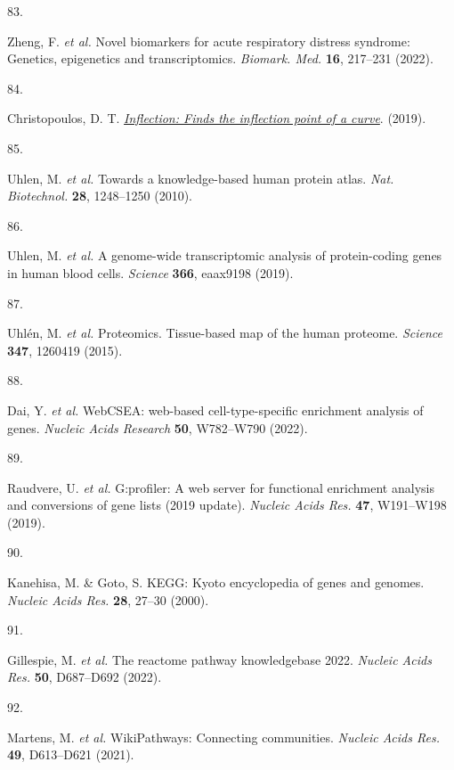 \documentclass[
  11,
  a4paper,
]{article}
\newlength{\cslhangindent}
\newlength{\csllabelwidth}
\newlength{\cslentryspacingunit} %
\newenvironment{CSLReferences}[2] %
 {%
  \setlength{\parindent}{0pt}
  \ifodd #1
  \let\oldpar\par
  \def\par{\hangindent=\cslhangindent\oldpar}
  \fi
  \setlength{\parskip}{#2\cslentryspacingunit}
 }%
 {}
\newcommand{\CSLLeftMargin}[1]{\parbox[t]{\csllabelwidth}{#1}}
\newcommand{\CSLRightInline}[1]{\parbox[t]{\linewidth - \csllabelwidth}{#1}\break}
\begin{document}
\begin{CSLReferences}{0}{0}
\leavevmode{}%
\CSLLeftMargin{83. }%
\CSLRightInline{Zheng, F. \emph{et al.} Novel biomarkers for acute
respiratory distress syndrome: Genetics, epigenetics and
transcriptomics. \emph{Biomark. Med.} \textbf{16}, 217--231 (2022).}

\leavevmode{}%
\CSLLeftMargin{84. }%
\CSLRightInline{Christopoulos, D. T.
\emph{\href{https://CRAN.R-project.org/package=inflection}{Inflection:
Finds the inflection point of a curve}}. (2019).}

\leavevmode{}%
\CSLLeftMargin{85. }%
\CSLRightInline{Uhlen, M. \emph{et al.} Towards a knowledge-based human
protein atlas. \emph{Nat. Biotechnol.} \textbf{28}, 1248--1250 (2010).}

\leavevmode{}%
\CSLLeftMargin{86. }%
\CSLRightInline{Uhlen, M. \emph{et al.} A genome-wide transcriptomic
analysis of protein-coding genes in human blood cells. \emph{Science}
\textbf{366}, eaax9198 (2019).}

\leavevmode{}%
\CSLLeftMargin{87. }%
\CSLRightInline{Uhlén, M. \emph{et al.} Proteomics. Tissue-based map of
the human proteome. \emph{Science} \textbf{347}, 1260419 (2015).}

\leavevmode{}%
\CSLLeftMargin{88. }%
\CSLRightInline{Dai, Y. \emph{et al.} {WebCSEA: web-based
cell-type-specific enrichment analysis of genes}. \emph{Nucleic Acids
Research} \textbf{50}, W782--W790 (2022).}

\leavevmode{}%
\CSLLeftMargin{89. }%
\CSLRightInline{Raudvere, U. \emph{et al.} G:profiler: A web server for
functional enrichment analysis and conversions of gene lists (2019
update). \emph{Nucleic Acids Res.} \textbf{47}, W191--W198 (2019).}

\leavevmode{}%
\CSLLeftMargin{90. }%
\CSLRightInline{Kanehisa, M. \& Goto, S. {KEGG}: Kyoto encyclopedia of
genes and genomes. \emph{Nucleic Acids Res.} \textbf{28}, 27--30
(2000).}

\leavevmode{}%
\CSLLeftMargin{91. }%
\CSLRightInline{Gillespie, M. \emph{et al.} The reactome pathway
knowledgebase 2022. \emph{Nucleic Acids Res.} \textbf{50}, D687--D692
(2022).}

\leavevmode{}%
\CSLLeftMargin{92. }%
\CSLRightInline{Martens, M. \emph{et al.} {WikiPathways}: Connecting
communities. \emph{Nucleic Acids Res.} \textbf{49}, D613--D621 (2021).}


\end{CSLReferences}
\end{document}
